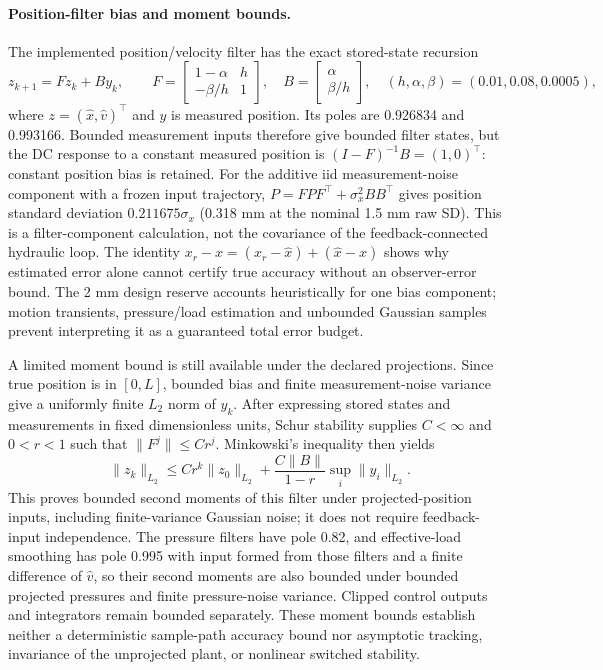 \paragraph{Position-filter bias and moment bounds.}
The implemented position/velocity filter has the exact stored-state recursion
\begin{equation}
 z_{k+1}=Fz_k+By_k,\qquad
 F=\begin{bmatrix}1-\alpha&h\\-\beta/h&1\end{bmatrix},\quad
 B=\begin{bmatrix}\alpha\\\beta/h\end{bmatrix},\quad
 (h,\alpha,\beta)=(0.01,0.08,0.0005),
\end{equation}
where $z=(\hat x,\hat v)^\top$ and $y$ is measured position. Its poles are 0.926834 and 0.993166. Bounded measurement inputs therefore give bounded filter states, but the DC response to a constant measured position is $(I-F)^{-1}B=(1,0)^\top$: constant position bias is retained. For the additive iid measurement-noise component with a frozen input trajectory, $P=FPF^\top+\sigma_x^2BB^\top$ gives position standard deviation $0.211675\sigma_x$ (0.318 mm at the nominal 1.5 mm raw SD). This is a filter-component calculation, not the covariance of the feedback-connected hydraulic loop. The identity $x_r-x=(x_r-\hat x)+(\hat x-x)$ shows why estimated error alone cannot certify true accuracy without an observer-error bound. The 2 mm design reserve accounts heuristically for one bias component; motion transients, pressure/load estimation and unbounded Gaussian samples prevent interpreting it as a guaranteed total error budget.

A limited moment bound is still available under the declared projections. Since true position is in $[0,L]$, bounded bias and finite measurement-noise variance give a uniformly finite $L_2$ norm of $y_k$. After expressing stored states and measurements in fixed dimensionless units, Schur stability supplies $C<\infty$ and $0<r<1$ such that $\|F^j\|\le Cr^j$. Minkowski's inequality then yields
\begin{equation}
 \|z_k\|_{L_2}\le Cr^k\|z_0\|_{L_2}
 +\frac{C\|B\|}{1-r}\sup_i\|y_i\|_{L_2}.
\end{equation}
This proves bounded second moments of this filter under projected-position inputs, including finite-variance Gaussian noise; it does not require feedback-input independence. The pressure filters have pole 0.82, and effective-load smoothing has pole 0.995 with input formed from those filters and a finite difference of $\hat v$, so their second moments are also bounded under bounded projected pressures and finite pressure-noise variance. Clipped control outputs and integrators remain bounded separately. These moment bounds establish neither a deterministic sample-path accuracy bound nor asymptotic tracking, invariance of the unprojected plant, or nonlinear switched stability.

